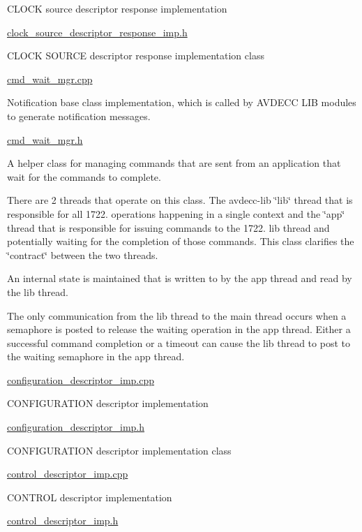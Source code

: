 C\+L\+O\+CK source descriptor response implementation

\hyperlink{clock__source__descriptor__response__imp_8h}{clock\+\_\+source\+\_\+descriptor\+\_\+response\+\_\+imp.\+h}

C\+L\+O\+CK S\+O\+U\+R\+CE descriptor response implementation class

\hyperlink{cmd__wait__mgr_8cpp}{cmd\+\_\+wait\+\_\+mgr.\+cpp}

Notification base class implementation, which is called by A\+V\+D\+E\+CC L\+IB modules to generate notification messages.

\hyperlink{cmd__wait__mgr_8h}{cmd\+\_\+wait\+\_\+mgr.\+h}

A helper class for managing commands that are sent from an application that wait for the commands to complete.

There are 2 threads that operate on this class. The avdecc-\/lib \char`\"{}lib\char`\"{} thread that is responsible for all 1722. operations happening in a single context and the \char`\"{}app\char`\"{} thread that is responsible for issuing commands to the 1722. lib thread and potentially waiting for the completion of those commands. This class clarifies the \char`\"{}contract\char`\"{} between the two threads.

An internal state is maintained that is written to by the app thread and read by the lib thread.

The only communication from the lib thread to the main thread occurs when a semaphore is posted to release the waiting operation in the app thread. Either a successful command completion or a timeout can cause the lib thread to post to the waiting semaphore in the app thread.

\hyperlink{configuration__descriptor__imp_8cpp}{configuration\+\_\+descriptor\+\_\+imp.\+cpp}

C\+O\+N\+F\+I\+G\+U\+R\+A\+T\+I\+ON descriptor implementation

\hyperlink{configuration__descriptor__imp_8h}{configuration\+\_\+descriptor\+\_\+imp.\+h}

C\+O\+N\+F\+I\+G\+U\+R\+A\+T\+I\+ON descriptor implementation class

\hyperlink{control__descriptor__imp_8cpp}{control\+\_\+descriptor\+\_\+imp.\+cpp}

C\+O\+N\+T\+R\+OL descriptor implementation

\hyperlink{control__descriptor__imp_8h}{control\+\_\+descriptor\+\_\+imp.\+h}

